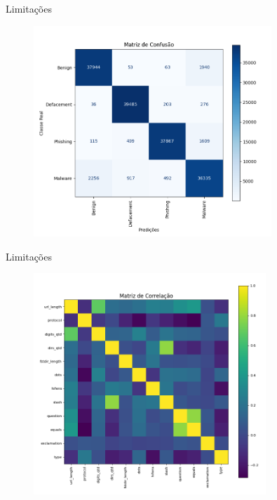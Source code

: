 \documentclass{beamer}
\begin{document}
\begin{frame}{Limitações}

    \begin{figure}
        \centering
        \vspace*{-0.3cm}
        \includegraphics[width=0.8\textwidth]{pic/confusion.png}
        \label{fig:map4}
    \end{figure}
    
\end{frame}


\begin{frame}{Limitações}

    \begin{figure}
        \centering
        \vspace*{-0.3cm}
        \includegraphics[width=0.78\textwidth]{pic/corr.png}
        \label{fig:map4}
    \end{figure}
    
\end{frame}
\end{document}
